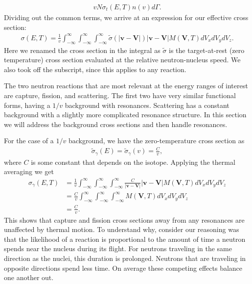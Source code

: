 \begin{align}
   v N \sigma_t(E,T) n(v) d\Gamma \nonumber .
\end{align}
Dividing out the common terms, we arrive at an expression for our effective cross section:
\begin{align} \label{Eq:nuclearData_thermalAveragedXS}
  \sigma(E,T) = \frac{1}{v} \int_{-\infty}^\infty \int_{-\infty}^\infty  \int_{-\infty}^\infty \tilde{\sigma}(|\mathbf{v} - \mathbf{V}|) | \mathbf{v} - \mathbf{V} | M(\mathbf{V},T) dV_x dV_y dV_z .
\end{align}
Here we renamed the cross section in the integral as $\tilde{\sigma}$ is the target-at-rest (zero temperature) cross section evaluated at the relative neutron-nucleus speed. We also took off the subscript, since this applies to any reaction.

The two neutron reactions that are most relevant at the energy ranges of interest are capture, fission, and scattering. The first two have very similar functional forms, having a $1/v$ background with resonances. Scattering has a constant background with a slightly more complicated resonance structure. In this section we will address the background cross sections and then handle resonances.

For the case of a $1/v$ background, we have the zero-temperature cross section as
\begin{align}
  \tilde{\sigma}_\gamma(E) = \tilde{\sigma}_\gamma(v) = \frac{ C }{ v },
\end{align}
where $C$ is some constant that depends on the isotope. Applying the thermal averaging we get
\begin{align}
  \sigma_\gamma(E,T) &= \frac{1}{v}  \int_{-\infty}^\infty \int_{-\infty}^\infty  \int_{-\infty}^\infty \frac{C}{ | \mathbf{v} - \mathbf{V} | } | \mathbf{v} - \mathbf{V} | M(\mathbf{V},T) dV_x dV_y dV_z \nonumber \\
  &= \frac{C}{v}  \int_{-\infty}^\infty \int_{-\infty}^\infty  \int_{-\infty}^\infty  M(\mathbf{V},T) dV_x dV_y dV_z \nonumber \\
  &= \frac{C}{v} .
\end{align}
This shows that capture and fission cross sections away from any resonances are unaffected by thermal motion. To understand why, consider our reasoning was that the likelihood of a reaction is proportional to the amount of time a neutron spends near the nucleus during its flight. For neutrons traveling in the same direction as the nuclei, this duration is prolonged. Neutrons that are traveling in opposite directions spend less time. On average these competing effects balance one another out.

